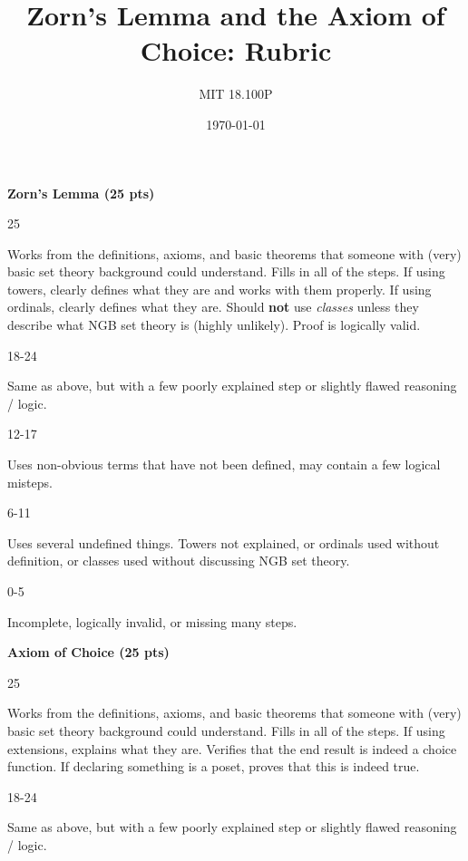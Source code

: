 \documentclass{article}
\title{Zorn's Lemma and the Axiom of Choice: Rubric}
\author{MIT 18.100P}
\date{\today}
\begin{document}
    \textbf{Zorn's Lemma (25 pts)}
    \par\hfill\par
    25
    \par
    Works from the definitions, axioms, and basic theorems that
    someone with (very) basic set theory background could
    understand. Fills in all of the steps. If using towers, clearly
    defines what they are and works with them properly. If using
    ordinals, clearly defines what they are. Should \textbf{not}
    use \textit{classes} unless they describe what NGB set theory
    is (highly unlikely). Proof is logically valid.
    \par\hfill\par
    18-24
    \par
    Same as above, but with a few poorly explained step or slightly
    flawed reasoning / logic.
    \par\hfill\par
    12-17
    \par
    Uses non-obvious terms that have not been defined, may contain a few
    logical misteps.
    \par\hfill\par
    6-11
    \par
    Uses several undefined things. Towers not explained, or ordinals used
    without definition, or classes used without discussing NGB set theory.
    \par\hfill\par
    0-5
    \par
    Incomplete, logically invalid, or missing many steps.
    \par\hfill\par
    \textbf{Axiom of Choice (25 pts)}
    \par\hfill\par
    25
    \par
    Works from the definitions, axioms, and basic theorems that
    someone with (very) basic set theory background could
    understand. Fills in all of the steps. If using extensions, explains what
    they are. Verifies that the end result is indeed a choice function.
    If declaring something is a poset, proves that this is indeed true.
    \par\hfill\par
    18-24
    \par
    Same as above, but with a few poorly explained step or slightly
    flawed reasoning / logic.
    \par\hfill\par
\end{document}
